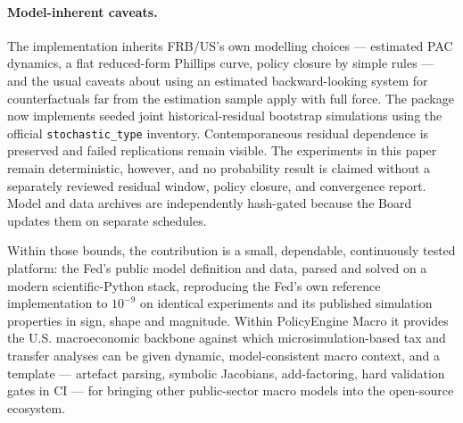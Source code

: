 \paragraph{Model-inherent caveats.} The implementation inherits FRB/US's own modelling choices --- estimated PAC dynamics, a flat reduced-form Phillips curve, policy closure by simple rules --- and the usual caveats about using an estimated backward-looking system for counterfactuals far from the estimation sample apply with full force. The package now implements seeded joint historical-residual bootstrap simulations using the official \texttt{stochastic\_type} inventory. Contemporaneous residual dependence is preserved and failed replications remain visible. The experiments in this paper remain deterministic, however, and no probability result is claimed without a separately reviewed residual window, policy closure, and convergence report. Model and data archives are independently hash-gated because the Board updates them on separate schedules.

\medskip

\noindent Within those bounds, the contribution is a small, dependable, continuously tested platform: the Fed's public model definition and data, parsed and solved on a modern scientific-Python stack, reproducing the Fed's own reference implementation to $10^{-9}$ on identical experiments and its published simulation properties in sign, shape and magnitude. Within PolicyEngine Macro it provides the U.S. macroeconomic backbone against which microsimulation-based tax and transfer analyses can be given dynamic, model-consistent macro context, and a template --- artefact parsing, symbolic Jacobians, add-factoring, hard validation gates in CI --- for bringing other public-sector macro models into the open-source ecosystem.
